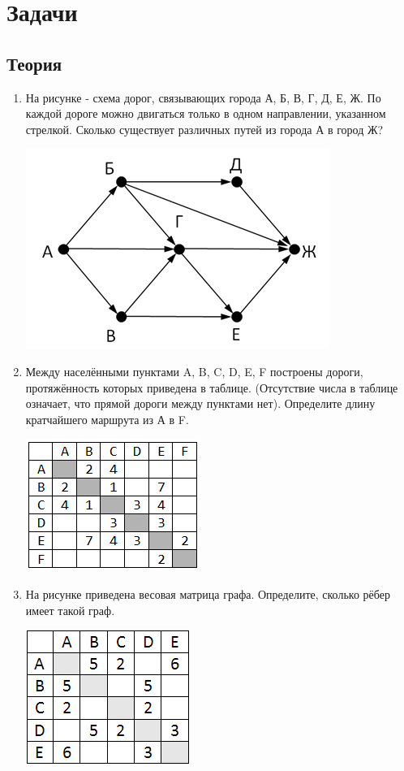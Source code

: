 \documentclass[12pt]{article}
\begin{document}
\section*{Задачи}
\subsection*{Теория}
\begin{enumerate}
\item На рисунке - схема дорог, связывающих города А, Б, В, Г, Д, Е, Ж. По каждой дороге можно двигаться только в одном направлении, указанном стрелкой. Сколько существует различных путей из города А в город Ж?

\includegraphics[width=0.3333\linewidth]{numway4}

\item Между населёнными пунктами A, B, C, D, E, F построены дороги, протяжённость которых приведена в таблице. (Отсутствие числа в таблице означает, что прямой дороги между пунктами нет). Определите длину кратчайшего маршрута из А в F.

\includegraphics[width=0.3333\linewidth]{minaf}

\item На рисунке приведена весовая матрица графа. Определите, сколько рёбер имеет такой граф.

\includegraphics[width=0.3333\linewidth]{numribs1}

\end{enumerate}
\end{document}
